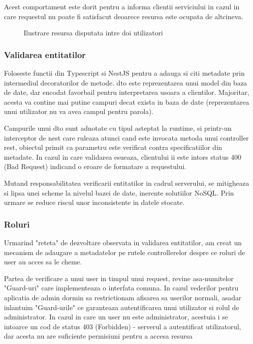 Acest comportament este dorit pentru a informa clientii serviciului in cazul in care requestul nu poate fi satisfacut deoarece resursa este ocupata de altcineva.

\begin{figure}[H]
  \centering
  \caption{Ilustrare resursa disputata intre doi utilizatori}
\end{figure}


\subsubsection {Validarea entitatilor}

Foloseste functii din Typescript si NestJS pentru a adauga si citi metadate prin intermediul decoratorilor de metode. \acrfull{dto} este reprezentarea unui model din baza de date, dar encodat favorbail pentru interpretarea usoara a clientilor. Majoritar, acesta va contine mai putine campuri decat exista in baza de date (reprezentarea unui utilizator nu va avea campul pentru parola).

Campurile unui \acrfull{dto} sunt adnotate cu tipul asteptat la runtime, si printr-un interceptor de nest care ruleaza atunci cand este invocata metoda unui controller \acrshort{rest}, obiectul primit ca parametru este verificat contra specificatiilor din metadate. In cazul in care validarea esueaza, clientului ii este intors status 400 (Bad Request) indicand o eroare de formatare a requestului.

Mutand responsabilitatea verificarii entitatilor in cadrul serverului, se mitigheaza si lipsa unei scheme la nivelul bazei de date, inerente solutiilor NoSQL. Prin urmare se reduce riscul unor inconsistente in datele stocate.

\subsubsection {Roluri}

Urmarind "reteta" de dezvoltare observata in validarea entitatilor, am creat un mecanism de adaugare a metadatelor pe rutele controllerelor despre ce roluri de user au acces sa le cheme.

Partea de verificare a unui user in timpul unui request, revine asa-numitelor "Guard-uri" care implementeaza o interfata comuna. In cazul vederilor pentru aplicatia de admin dormin sa restrictionam afisarea sa userilor normali, asadar inlantuim "Guard-urile" ce garanteaza autentificarea unui utilizator si rolul de administrator. In cazul in care un user nu este administrator, acestuia i se intoarce un cod de status 403 (Forbidden) - serverul a autentificat utilizatorul, dar acesta nu are suficiente permisiuni pentru a accesa resursa

